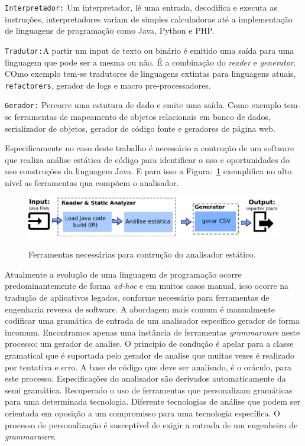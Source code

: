 \texttt{Interpretador:} Um interpretador, lê uma entrada, decodifica e executa as instruções, interpretadores variam de simples calculadoras até a implementação de linguagens de programação como Java, Python e PHP.

\texttt{Tradutor:}A partir um input de texto ou binário é emitido uma saída para uma linguagem que pode ser a mesma ou não. É a combinação do \textit{reader} e \textit{generator}. COmo exemplo tem-se tradutores de linguagens extintas para linguagens atuais, \texttt{refactorers},  gerador de logs e macro pre-processadores.
	
\texttt{Gerador:} Percorre uma estutura de dado e emite uma saída. Como exemplo tem-se ferramentas de mapeamento de objetos relacionais em banco de dados, serializador de objetos, gerador de código fonte e geradores de página web.



Especificamente no caso deste trabalho é necessário a contrução de um software que realiza análise estática de código para identificar o uso e oportunidades do uso construções da linguagem Java. E para isso a Figura:~\ref{fig:stagesAnalyzer} exemplifica no alto nível as ferramentas qua compõem o analisador.

\begin{figure}[h]
	\center
	\includegraphics[scale=0.9]{Imagens/stagesAnalizer}
	\label{fig:stagesAnalyzer}
	\caption{Ferramentas necessárias para contrução do analisador estático.}
\end{figure}


Atualmente a evolução de uma linguagem de programação ocorre predominantemente de forma {\it ad-hoc} e em muitos casos manual, isso ocorre na tradução de aplicativos legados, conforme necessário para ferramentas de engenharia reversa de software. A abordagem mais comum é manualmente codificar uma gramática de entrada de um analisador específico gerador de forma incomum. Encontramos apenas uma instância de ferramentas {\it grammarware} neste processo: um gerador de analise. O princípio de condução é apelar para a classe gramatical que é suportada pelo gerador de analise que muitas vezes é realizado por tentativa e erro. A base de código que deve ser analisado, é o oráculo, para este processo. Especificações do analisador são derivados automaticamente da semi gramática. Recuperado
o uso de ferramentas que personalizam gramáticas para uma determinada tecnologia. Diferente
tecnologias de análise que podem ser orientada em oposição a um compromisso para uma
tecnologia específica. O processo de personalização é susceptível de exigir a entrada de
um engenheiro de {\it grammarware}.

